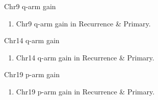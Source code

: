 \documentclass{beamer}
\begin{document}
\begin{frame}[allowframebreaks]
        \begin{block}{Chr9 q-arm gain}
            \begin{enumerate}
                \item Chr9 q-arm gain in Recurrence \& Primary.
            \end{enumerate}

            \begin{table}
                \caption{CGC Tier1 genes in Chr9 q-arm}
                \resizebox{\linewidth}{!}
                {}
            \end{table}
        \end{block}

        \begin{block}{Chr14 q-arm gain}
            \begin{enumerate}
                \item Chr14 q-arm gain in Recurrence \& Primary.
            \end{enumerate}

            \begin{table}
                \caption{CGC Tier1 genes in Chr14 q-arm}
                \resizebox{\linewidth}{!}
                {}
            \end{table}
        \end{block}

        \begin{block}{Chr19 p-arm gain}
            \begin{enumerate}
                \item Chr19 p-arm gain in Recurrence \& Primary.
            \end{enumerate}

            \begin{table}
                \caption{CGC Tier1 genes in Chr19 p-arm}
                \resizebox{\linewidth}{!}
                {}
            \end{table}
        \end{block}
    \end{frame}
\end{document}
